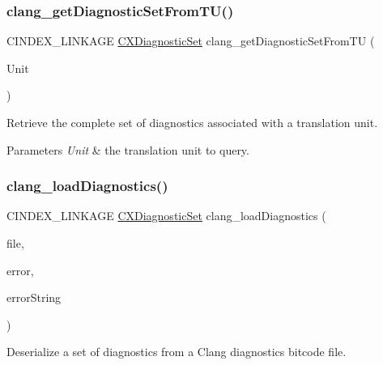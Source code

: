 \subsubsection{\texorpdfstring{clang\+\_\+get\+Diagnostic\+Set\+From\+T\+U()}{clang\_getDiagnosticSetFromTU()}}
{\footnotesize\ttfamily C\+I\+N\+D\+E\+X\+\_\+\+L\+I\+N\+K\+A\+GE \mbox{\hyperlink{group__CINDEX__DIAG_ga38dfc0ae45b55bf7fd577eed9148e244}{C\+X\+Diagnostic\+Set}} clang\+\_\+get\+Diagnostic\+Set\+From\+TU (\begin{DoxyParamCaption}\item[{\mbox{\hyperlink{group__CINDEX_gacdb7815736ca709ce9a5e1ec2b7e16ac}{C\+X\+Translation\+Unit}}}]{Unit }\end{DoxyParamCaption})}



Retrieve the complete set of diagnostics associated with a translation unit. 


\begin{DoxyParams}{Parameters}
{\em Unit} & the translation unit to query. \\
\hline
\end{DoxyParams}
\mbox{\label{group__CINDEX__DIAG_gaa1e3aff15dc2eb97330533f0c68bd28f}} 
\subsubsection{\texorpdfstring{clang\+\_\+load\+Diagnostics()}{clang\_loadDiagnostics()}}
{\footnotesize\ttfamily C\+I\+N\+D\+E\+X\+\_\+\+L\+I\+N\+K\+A\+GE \mbox{\hyperlink{group__CINDEX__DIAG_ga38dfc0ae45b55bf7fd577eed9148e244}{C\+X\+Diagnostic\+Set}} clang\+\_\+load\+Diagnostics (\begin{DoxyParamCaption}\item[{const char $\ast$}]{file,  }\item[{enum \mbox{\hyperlink{group__CINDEX__DIAG_gafccf4d49329805ac24e6dc005aafc848}{C\+X\+Load\+Diag\+\_\+\+Error}} $\ast$}]{error,  }\item[{\mbox{\hyperlink{structCXString}{C\+X\+String}} $\ast$}]{error\+String }\end{DoxyParamCaption})}



Deserialize a set of diagnostics from a Clang diagnostics bitcode file. 


